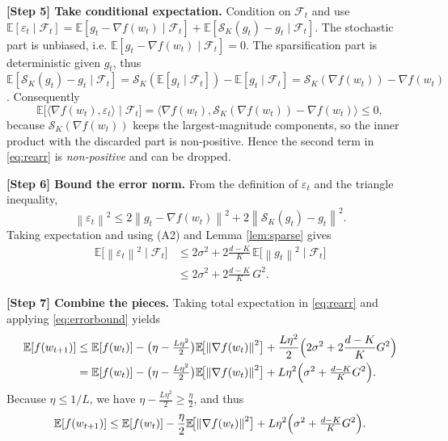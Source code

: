 \documentclass{article}
\newcommand{\E}{\mathbb{E}}
\newcommand{\norm}[1]{\left\|#1\right\|}
\newcommand{\topK}[2]{\mathcal{S}_{#1}(#2)}   %
\begin{document}
\noindent\textbf{[Step 5] Take conditional expectation.}
Condition on $\mathcal{F}_{t}$ and use $\E[\varepsilon_{t}\mid\mathcal{F}_{t}]
= \E[g_{t}-\nabla f(w_{t})\mid\mathcal{F}_{t}]
+ \E[\topK{K}{g_{t}}-g_{t}\mid\mathcal{F}_{t}]$.
The stochastic part is unbiased, i.e. $\E[g_{t}-\nabla f(w_{t})\mid\mathcal{F}_{t}]=0$.
The sparsification part is deterministic given $g_{t}$, thus
$\E[\topK{K}{g_{t}}-g_{t}\mid\mathcal{F}_{t}]
= \topK{K}{\E[g_{t}\mid\mathcal{F}_{t}]}-\E[g_{t}\mid\mathcal{F}_{t}]
= \topK{K}{\nabla f(w_{t})}-\nabla f(w_{t})$.
Consequently
\[
\E\!\bigl[\langle\nabla f(w_{t}),\varepsilon_{t}\rangle\mid\mathcal{F}_{t}\bigr]
= \langle\nabla f(w_{t}),\topK{K}{\nabla f(w_{t})}-\nabla f(w_{t})\rangle
\le 0,
\]
because $\topK{K}{\nabla f(w_{t})}$ keeps the largest‑magnitude components,
so the inner product with the discarded part is non‑positive.
Hence the second term in \eqref{eq:rearr} is \emph{non‑positive} and can be dropped.

\noindent\textbf{[Step 6] Bound the error norm.}
From the definition of $\varepsilon_{t}$ and the triangle inequality,
\[
\norm{\varepsilon_{t}}^{2}
\le 2\norm{g_{t}-\nabla f(w_{t})}^{2}
+2\norm{\topK{K}{g_{t}}-g_{t}}^{2}.
\]
Taking expectation and using (A2) and Lemma \ref{lem:sparse} gives
\begin{align}
\E\!\bigl[\norm{\varepsilon_{t}}^{2}\mid\mathcal{F}_{t}\bigr]
&\le 2\sigma^{2}+2\frac{d-K}{K}\,\E\!\bigl[\norm{g_{t}}^{2}\mid\mathcal{F}_{t}\bigr]\nonumber\\
&\le 2\sigma^{2}+2\frac{d-K}{K}\,G^{2}. \label{eq:errorbound}
\end{align}

\noindent\textbf{[Step 7] Combine the pieces.}
Taking total expectation in \eqref{eq:rearr} and applying \eqref{eq:errorbound} yields
\begin{align}
\E[f(w_{t+1})]
&\le \E[f(w_{t})]
-\bigl(\eta-\tfrac{L\eta^{2}}{2}\bigr)\E\!\bigl[\norm{\nabla f(w_{t})}^{2}\bigr]
+\frac{L\eta^{2}}{2}\Bigl(2\sigma^{2}+2\frac{d-K}{K}G^{2}\Bigr) \nonumber\\
&= \E[f(w_{t})]
-\bigl(\eta-\tfrac{L\eta^{2}}{2}\bigr)\E\!\bigl[\norm{\nabla f(w_{t})}^{2}\bigr]
+L\eta^{2}\Bigl(\sigma^{2}+ \tfrac{d-K}{K}G^{2}\Bigr). \label{eq:recursion}
\end{align}
Because $\eta\le 1/L$, we have $\eta-\frac{L\eta^{2}}{2}\ge \frac{\eta}{2}$, and thus
\begin{equation}
\E[f(w_{t+1})]\le \E[f(w_{t})]
-\frac{\eta}{2}\E\!\bigl[\norm{\nabla f(w_{t})}^{2}\bigr]
+L\eta^{2}\Bigl(\sigma^{2}+ \tfrac{d-K}{K}G^{2}\Bigr). \label{eq:recursion2}
\end{equation}
\end{document}
